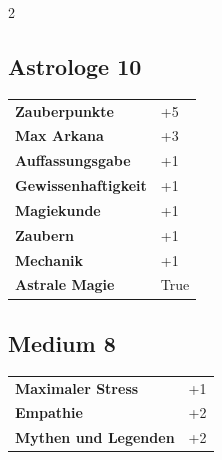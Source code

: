 \begin{multicols}{2}
\begin{tcolorbox}

\end{tcolorbox}

\begin{tcolorbox}
    \subsection*{Astrologe \hfill \small{10 }}
    \tcblower




\begin{tabular}{@{}ll@{}}
    \textbf{Zauberpunkte} & +5\\
    \textbf{Max Arkana} & +3\\
    \textbf{Auffassungsgabe} & +1\\
    \textbf{Gewissenhaftigkeit} & +1\\
    \textbf{Magiekunde} & +1\\
    \textbf{Zaubern} & +1\\
    \textbf{Mechanik} & +1\\
    \textbf{Astrale Magie} & True\\
\end{tabular}


\end{tcolorbox}

\begin{tcolorbox}
    \subsection*{Medium \hfill \small{8 }}
    \tcblower




\begin{tabular}{@{}ll@{}}
    \textbf{Maximaler Stress} & +1\\
    \textbf{Empathie} & +2\\
    \textbf{Mythen und Legenden} & +2\\
\end{tabular}



\end{tcolorbox}
\end{multicols}

